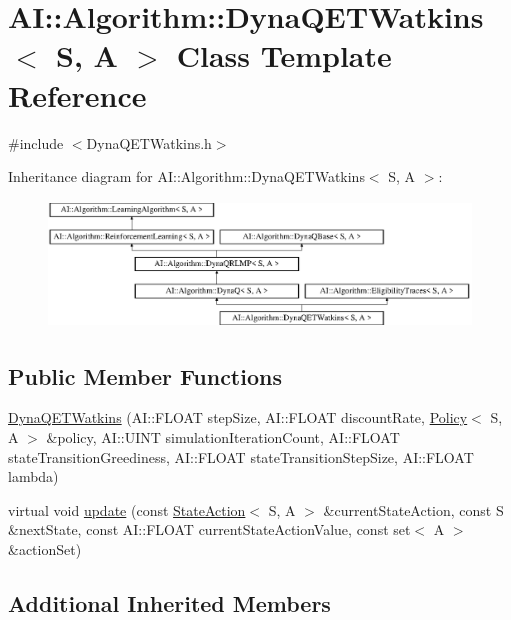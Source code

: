 \hypertarget{classAI_1_1Algorithm_1_1DynaQETWatkins}{\section{A\-I\-:\-:Algorithm\-:\-:Dyna\-Q\-E\-T\-Watkins$<$ S, A $>$ Class Template Reference}
\label{classAI_1_1Algorithm_1_1DynaQETWatkins}
}


{\ttfamily \#include $<$Dyna\-Q\-E\-T\-Watkins.\-h$>$}

Inheritance diagram for A\-I\-:\-:Algorithm\-:\-:Dyna\-Q\-E\-T\-Watkins$<$ S, A $>$\-:\begin{figure}[H]
\begin{center}
\leavevmode
\includegraphics[height=3.357314cm]{classAI_1_1Algorithm_1_1DynaQETWatkins}
\end{center}
\end{figure}
\subsection*{Public Member Functions}
\begin{DoxyCompactItemize}
\item 
\hyperlink{classAI_1_1Algorithm_1_1DynaQETWatkins_a06cc345554bc70be5c059c771f4a5634}{Dyna\-Q\-E\-T\-Watkins} (A\-I\-::\-F\-L\-O\-A\-T step\-Size, A\-I\-::\-F\-L\-O\-A\-T discount\-Rate, \hyperlink{classAI_1_1Algorithm_1_1Policy}{Policy}$<$ S, A $>$ \&policy, A\-I\-::\-U\-I\-N\-T simulation\-Iteration\-Count, A\-I\-::\-F\-L\-O\-A\-T state\-Transition\-Greediness, A\-I\-::\-F\-L\-O\-A\-T state\-Transition\-Step\-Size, A\-I\-::\-F\-L\-O\-A\-T lambda)
\item 
virtual void \hyperlink{classAI_1_1Algorithm_1_1DynaQETWatkins_aa4e40af0fd705cd5d1f7fd13834c57c6}{update} (const \hyperlink{classAI_1_1StateAction}{State\-Action}$<$ S, A $>$ \&current\-State\-Action, const S \&next\-State, const A\-I\-::\-F\-L\-O\-A\-T current\-State\-Action\-Value, const set$<$ A $>$ \&action\-Set)
\end{DoxyCompactItemize}
\subsection*{Additional Inherited Members}


